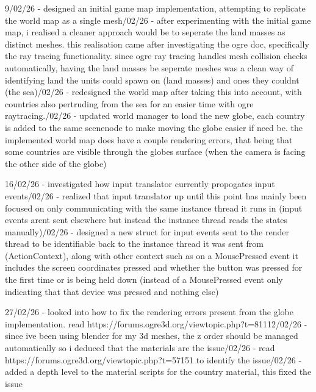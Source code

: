 \documentclass[]{final_report}
\begin{document}
9/02/26 - designed an initial game map implementation, attempting to replicate the world map as a single mesh/02/26 - after experimenting with the initial game map, i realised a cleaner approach would be to seperate the land masses as distinct meshes. this realisation came after investigating the ogre doc, specifically the ray tracing functionality. since ogre ray tracing handles mesh collision checks automatically, having the land masses be seperate meshes was a clean way of identifying land the units could spawn on (land masses) and ones they couldnt (the sea)/02/26 - redesigned the world map after taking this into account, with countries also pertruding from the sea for an easier time with ogre raytracing./02/26 - updated world manager to load the new globe, each country is added to the same scenenode to make moving the globe easier if need be. the implemented world map does have a couple rendering errors, that being that some countries are visible through the globes surface (when the camera is facing the other side of the globe)\newline

16/02/26 - investigated how input translator currently propogates input events/02/26 - realized that input translator up until this point has mainly been focused on only communicating with the same instance thread it runs in (input events arent sent elsewhere but instead the instance thread reads the states manually)/02/26 - designed a new struct for input events sent to the render thread to be identifiable back to the instance thread it was sent from (ActionContext), along with other context such as on a MousePressed event it includes the screen coordinates pressed and whether the button was pressed for the first time or is being held down (instead of a MousePressed event only indicating that that device was pressed and nothing else)\newline

27/02/26 - looked into how to fix the rendering errors present from the globe implementation. read https://forums.ogre3d.org/viewtopic.php?t=81112/02/26 - since ive been using blender for my 3d meshes, the z order should be managed automatically so i deduced that the materials are the issue/02/26 - read https://forums.ogre3d.org/viewtopic.php?t=57151 to identify the issue/02/26 - added a depth  level to the material scripts for the country material, this fixed the issue\newline
\end{document}
